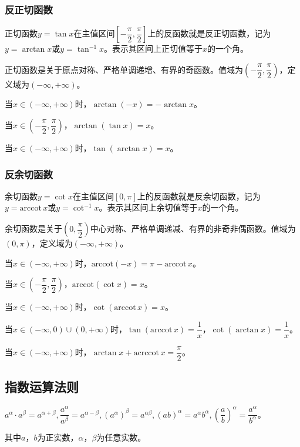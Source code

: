 \documentclass[UTF8, 12pt]{ctexart}
\begin{document}
\subsubsection{反正切函数}

正切函数$y=\tan x$在主值区间$\left[-\dfrac{\pi}{2},\dfrac{\pi}{2}\right]$上的反函数就是反正切函数，记为$y=\arctan x$或$y=\tan^{-1}x$。表示其区间上正切值等于$x$的一个角。

正切函数是关于原点对称、严格单调递增、有界的奇函数。值域为$\left(-\dfrac{\pi}{2},\dfrac{\pi}{2}\right)$，定义域为$(-\infty,+\infty)$。

当$x\in(-\infty,+\infty)$时，$\arctan(-x)=-\arctan x$。

当$x\in\left(-\dfrac{\pi}{2},\dfrac{\pi}{2}\right)$，$\arctan(\tan x)=x$。

当$x\in(-\infty,+\infty)$时，$\tan(\arctan x)=x$。

\subsubsection{反余切函数}

余切函数$y=\cot x$在主值区间$[0,\pi]$上的反函数就是反余切函数，记为$y=\textrm{arccot}\,x$或$y=\cot^{-1}x$。表示其区间上余切值等于$x$的一个角。

余切函数是关于$\left(0,\dfrac{\pi}{2}\right)$中心对称、严格单调递减、有界的非奇非偶函数。值域为$(0,\pi)$，定义域为$(-\infty,+\infty)$。

当$x\in(-\infty,+\infty)$时，$\textrm{arccot}(-x)=\pi-\textrm{arccot}\,x$。

当$x\in\left(-\dfrac{\pi}{2},\dfrac{\pi}{2}\right)$，$\textrm{arccot}(\cot x)=x$。

当$x\in(-\infty,+\infty)$时，$\cot(\textrm{arccot}\,x)=x$。

当$x\in(-\infty,0)\cup(0,+\infty)$时，$\tan(\textrm{arccot}\,x)=\dfrac{1}{x}$，$\cot(\arctan x)=\dfrac{1}{x}$。

当$x\in(-\infty,+\infty)$时，$\arctan x+\textrm{acrccot}\,x=\dfrac{\pi}{2}$。

\subsection{指数运算法则}

$a^\alpha\cdot a^\beta=a^{\alpha+\beta},\dfrac{a^\alpha}{a^\beta}=a^{\alpha-\beta},(a^\alpha)^\beta=a^{\alpha\beta},(ab)^\alpha=a^\alpha b^\alpha,(\dfrac{a}{b})^\alpha=\dfrac{a^\alpha}{b^\alpha}$。

其中$a$，$b$为正实数，$\alpha$，$\beta$为任意实数。
\end{document}
